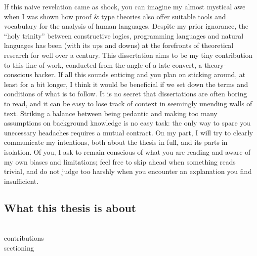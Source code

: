 If this naive revelation came as shock, you can imagine my almost mystical awe when I was shown how proof \& type theories also offer suitable tools and vocabulary for the analysis of human languages. 
Despite my prior ignorance, the “holy trinity” between constructive logics, programming languages and natural languages has been (with its ups and downs) at the forefronts of theoretical research for well over a century. 
This dissertation aims to be my tiny contribution to this line of work, conducted from the angle of a late convert, a theory-conscious hacker. 
If all this sounds enticing and you plan on sticking around, at least for a bit longer, I think it would be beneficial if we set down the terms and conditions of what is to follow. 
It is no secret that dissertations are often boring to read, and it can be easy to lose track of context in seemingly unending walls of text. 
Striking a balance between being pedantic and making too many assumptions on background knowledge is no easy task: the only way to spare you unecessary headaches requires a mutual contract. 
On my part, I will try to clearly communicate my intentions, both about the thesis in full, and its parts in isolation. 
Of you, I ask to remain conscious of what you are reading and aware of my own biases and limitations; feel free to skip ahead when something reads trivial, and do not judge too harshly when you encounter an explanation you find insufficient.

\subsection*{What this thesis is about}
\todo \\
contributions \\
sectioning
%
